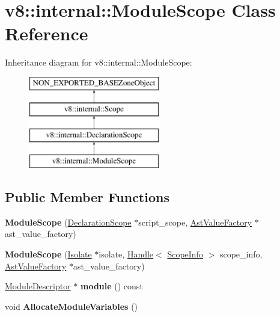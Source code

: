\hypertarget{classv8_1_1internal_1_1ModuleScope}{}\section{v8\+:\+:internal\+:\+:Module\+Scope Class Reference}
\label{classv8_1_1internal_1_1ModuleScope}
Inheritance diagram for v8\+:\+:internal\+:\+:Module\+Scope\+:\begin{figure}[H]
\begin{center}
\leavevmode
\includegraphics[height=4.000000cm]{classv8_1_1internal_1_1ModuleScope}
\end{center}
\end{figure}
\subsection*{Public Member Functions}
\begin{DoxyCompactItemize}
\item 
\mbox{\label{classv8_1_1internal_1_1ModuleScope_afb5d008257d99c7f974dcc624af9b67c}} 
{\bfseries Module\+Scope} (\mbox{\hyperlink{classv8_1_1internal_1_1DeclarationScope}{Declaration\+Scope}} $\ast$script\+\_\+scope, \mbox{\hyperlink{classv8_1_1internal_1_1AstValueFactory}{Ast\+Value\+Factory}} $\ast$ast\+\_\+value\+\_\+factory)
\item 
\mbox{\label{classv8_1_1internal_1_1ModuleScope_a105104bc65e7f6692877743b4d19857d}} 
{\bfseries Module\+Scope} (\mbox{\hyperlink{classv8_1_1internal_1_1Isolate}{Isolate}} $\ast$isolate, \mbox{\hyperlink{classv8_1_1internal_1_1Handle}{Handle}}$<$ \mbox{\hyperlink{classv8_1_1internal_1_1ScopeInfo}{Scope\+Info}} $>$ scope\+\_\+info, \mbox{\hyperlink{classv8_1_1internal_1_1AstValueFactory}{Ast\+Value\+Factory}} $\ast$ast\+\_\+value\+\_\+factory)
\item 
\mbox{\label{classv8_1_1internal_1_1ModuleScope_aa3ea5520d65a0aa457aa285e71a81cdf}} 
\mbox{\hyperlink{classv8_1_1internal_1_1ModuleDescriptor}{Module\+Descriptor}} $\ast$ {\bfseries module} () const
\item 
\mbox{\label{classv8_1_1internal_1_1ModuleScope_add76ed21b6c36ae3595daa8353f0e8e6}} 
void {\bfseries Allocate\+Module\+Variables} ()
\end{DoxyCompactItemize}
